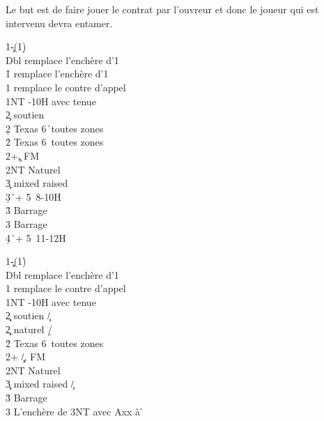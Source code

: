 \documentclass[a4paper]{article}
\begin{document}
Le but est de faire jouer le contrat par l’ouvreur et donc le joueur 
qui est intervenu devra entamer.

\begin{bidtable}
1\c-(1\d)\\
Dbl \> remplace l'enchère d'1\h \\
1\h \> remplace l'enchère d'1\s \\
1\s \> remplace le contre d'appel\\
1NT -10H avec tenue\\
2\c \> soutien \c \\
2\d \> Texas 6\h\ toutes zones\\
2\h \> Texas 6\s\ toutes zones\\
2\s {}+\c , FM\\
2NT \> Naturel\\
3\c \> mixed raised \c \\
3\d {}\h\ + 5\s\ 8-10H\\
3\h \> Barrage \h \\
3\s \> Barrage \s \\
4\d {}\h\ + 5\s\ 11-12H
\end{bidtable}

\begin{bidtable}
1\c\d-(1\h)\\
Dbl \> remplace l'enchère d'1\s \\
1\s \> remplace le contre d'appel\\
1NT -10H avec tenue\\
2\c\d \> soutien \c /\d \\
2\d\c \> naturel \d /\c \\
2\h \> Texas 6\s\ toutes zones\\
2\s {}+ \c /\d , FM\\
2NT \> Naturel\\
3\c\d \> mixed raised \c /\d \\
3\h \> Barrage \s \\
3\s \> L'enchère de 3NT avec Axx à \h 
\end{bidtable}
\end{document}
